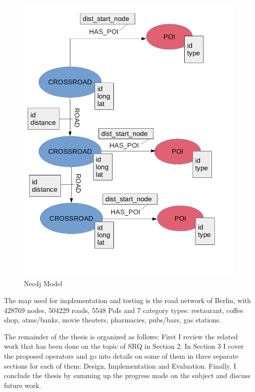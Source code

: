 \begin{figure}[h]
	\includegraphics[scale=0.4]{images/Neo4j-model.png}
	\centering
	\caption{Neo4j Model\cite{evagian}}
	\label{fig:neo4jmodel}
\end{figure}

The map used for implementation and testing is the road network of Berlin, with 428769 nodes, 504229 roads, 5548 PoIs and 7 category types: restaurant, coffee shop, atms/banks, movie theaters, pharmacies, pubs/bars, gas stations. 
\newline

The remainder of the thesis is organized as follows: First I review the related work that has been done on the topic of SRQ in Section 2. In Section 3 I cover the proposed operators and go into details on some of them in three separate sections for each of them: Design, Implementation and Evaluation. Finally, I conclude the thesis by summing up the progress made on the subject and discuss future work.
